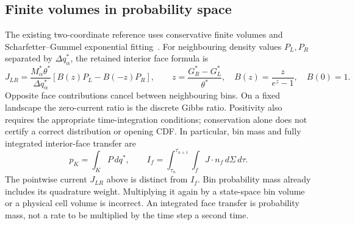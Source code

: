 \documentclass[11pt]{article}
\begin{document}
\subsection{Finite volumes in probability space}
The existing two-coordinate reference uses conservative finite volumes and
Scharfetter--Gummel exponential fitting~\cite{ScharfetterGummel1969}.
For neighbouring density values $P_L,P_R$ separated by $\Delta q_\alpha^*$,
the retained interior face formula is
\begin{equation}
 J_{LR}=\frac{M_\alpha^*\theta^*}{\Delta q_\alpha^*}
 \left[B(z)P_L-B(-z)P_R\right],\qquad
 z=\frac{G_R^*-G_L^*}{\theta^*},\quad B(z)=\frac{z}{e^z-1},\quad B(0)=1.
\end{equation}
Opposite face contributions cancel between neighbouring bins. On a fixed
landscape the zero-current ratio is the discrete Gibbs ratio.
Positivity also requires the appropriate time-integration conditions;
conservation alone does not certify a correct distribution or opening CDF.
In particular, bin mass and fully integrated interior-face transfer are
\begin{equation}
 p_K=\int_K P\,dq^*,\qquad
 I_f=\int_{\tau_n}^{\tau_{n+1}}\int_f J\cdot n_f\,d\Sigma\,d\tau.
\end{equation}
The pointwise current $J_{LR}$ above is distinct from $I_f$.
Bin probability mass already includes its quadrature weight. Multiplying it
again by a state-space bin volume or a physical cell volume is incorrect.
An integrated face transfer is probability mass, not a rate to be multiplied
by the time step a second time.
\end{document}
